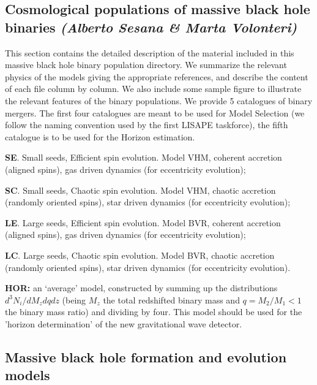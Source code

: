 \documentclass{iopart}
\newenvironment{itemize_estret}{
\begin{itemize}
  \setlength{\itemsep}{1pt}
  \setlength{\parskip}{0pt}
  \setlength{\parsep}{0pt}
}{\end{itemize}}
\begin{document}
\subsection{Cosmological populations of massive black hole binaries {\it (Alberto Sesana \& Marta Volonteri) }}
\label{SS:MBHbPop}


This section contains the detailed description of the material included 
in this massive black hole binary population directory. We summarize the 
relevant physics of the models giving the appropriate references, and 
describe the content of each file column by column. We also include 
some sample figure to illustrate the relevant features of the binary 
populations. We provide 5 catalogues of binary mergers. The first four catalogues
are meant to be used for Model Selection (we follow the naming convention used by the 
first LISAPE taskforce), the fifth catalogue is to be used for the Horizon estimation. 
\begin{itemize_estret}
\item {\bf SE}. Small seeds, Efficient spin evolution. Model VHM, coherent accretion (aligned spins), gas 
driven dynamics (for eccentricity evolution); 
\item {\bf SC}. Small seeds, Chaotic spin evolution. Model VHM, chaotic accretion (randomly oriented spins), star 
driven dynamics (for eccentricity evolution); 
\item {\bf LE}. Large seeds, Efficient spin evolution. Model BVR, coherent accretion (aligned spins), gas 
driven dynamics (for eccentricity evolution); 
\item {\bf LC}. Large seeds, Chaotic spin evolution. Model BVR, chaotic accretion (randomly oriented spins), star 
driven dynamics (for eccentricity evolution). 
\item {\bf HOR:} an `average' model, constructed by summing up the distributions $d^3N_i/dM_zdqdz$ 
(being $M_z$ the total redshifted binary mass and $q=M_2/M_1<1$ 
the binary mass ratio)  and dividing by four. This model should be used for the 'horizon determination'
of the new gravitational wave detector.
\end{itemize_estret}



\subsection{Massive black hole formation and evolution models}
\end{document}
